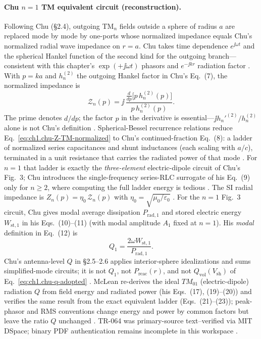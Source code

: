 \paragraph{Chu $n=1$ TM equivalent circuit (reconstruction).}
Following Chu \cite{chu1948,chu1948tr064} (\S2.4), outgoing TM$_n$ fields outside a sphere of radius $a$ are replaced mode by mode by one-ports whose normalized impedance equals Chu's normalized radial wave impedance on $r=a$. Chu takes time dependence $e^{\jj\omega t}$ and the spherical Hankel function of the second kind for the outgoing branch---consistent with this chapter's $\exp(+\jj\omega t)$ phasors and $e^{-\jj kr}$ radiation factor \cite{chu1948,chu1948tr064,stratton1941}. With $p=ka$ and $h_n^{(2)}$ the outgoing Hankel factor in Chu's Eq.~(7), the normalized impedance is
\begin{equation}
\label{eq:ch1.chu-Z-TM-normalized}
\mathcal{Z}_n(p)=\jj\,\frac{\displaystyle\frac{d}{dp}\bigl[p\,h_n^{(2)}(p)\bigr]}{p\,h_n^{(2)}(p)}.
\end{equation}
The prime denotes $d/dp$; the factor $p$ in the derivative is essential---$\jj h_n'^{(2)}/h_n^{(2)}$ alone is not Chu's definition \cite{chu1948tr064}. Spherical-Bessel recurrence relations reduce Eq.~\eqref{eq:ch1.chu-Z-TM-normalized} to Chu's continued-fraction Eq.~(8): a ladder of normalized series capacitances and shunt inductances (each scaling with $a/c$), terminated in a unit resistance that carries the radiated power of that mode \cite{chu1948tr064}. For $n=1$ that ladder is exactly the \emph{three-element} electric-dipole circuit of Chu's Fig.~3; Chu introduces the single-frequency series-RLC surrogate of his Eq.~(9) only for $n\ge2$, where computing the full ladder energy is tedious \cite{chu1948tr064}. The SI radial impedance is $Z_n(p)=\eta_0\,\mathcal{Z}_n(p)$ with $\eta_0=\sqrt{\mu_0/\varepsilon_0}$ \cite{chu1948,stratton1941}. For the $n=1$ Fig.~3 circuit, Chu gives modal average dissipation $P_{\mathrm{rad,1}}$ and stored electric energy $W_{\mathrm{st,1}}$ in his Eqs.~(10)--(11) (with modal amplitude $A_1$ fixed at $n=1$). His \emph{modal} definition in Eq.~(12) is
\begin{equation}
\label{eq:ch1.chu-Qn-def}
Q_1=\frac{2\omega W_{\mathrm{st,1}}}{P_{\mathrm{rad,1}}}.
\end{equation}
Chu's antenna-level $Q$ in \S2.5--2.6 applies interior-sphere idealizations and sums simplified-mode circuits; it is not $Q_1$, not $P_{\mathrm{reac}}(r)$, and not $Q_{\mathrm{vol}}(V_{\mathrm{sh}})$ of Eq.~\eqref{eq:ch1.chu-q-adopted} \cite{chu1948,chu1948tr064,mcclean1996}. McLean \cite{mcclean1996} re-derives the ideal $TM_{01}$ (electric-dipole) radiation $Q$ from field energy and radiated power (his Eqs.~(17), (19)--(20)) and verifies the same result from the exact equivalent ladder (Eqs.~(21)--(23)); peak-phasor and RMS conventions change energy and power by common factors but leave the ratio $Q$ unchanged \cite{mcclean1996}. TR-064 was primary-source text--verified via MIT DSpace; binary PDF authentication remains incomplete in this workspace \cite{chu1948tr064}.

